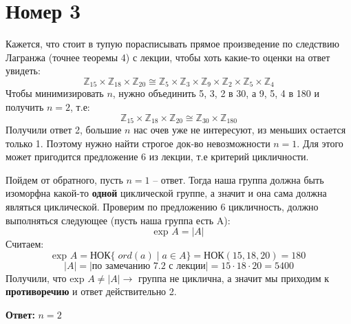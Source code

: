 \documentclass[a4paper,12pt, fleqn]{article}
\begin{document}
\section*{Номер 3}
Кажется, что стоит в тупую порасписывать прямое произведение по следствию Лагранжа (точнее теоремы 4) с лекции, чтобы хоть какие-то оценки на ответ увидеть:
\[
\mathbb{Z}_{15} \times \mathbb{Z}_{18} \times \mathbb{Z}_{20} \cong \mathbb{Z}_{5} \times \mathbb{Z}_{3} \times \mathbb{Z}_{9} \times \mathbb{Z}_{2} \times \mathbb{Z}_{5} \times \mathbb{Z}_{4}
\]
Чтобы минимизировать $n$, нужно объединить 5, 3, 2 в 30, а 9, 5, 4 в 180 и получить $n = 2$, т.е:
\[
\mathbb{Z}_{15} \times \mathbb{Z}_{18} \times \mathbb{Z}_{20} \cong \mathbb{Z}_{30} \times \mathbb{Z}_{180}
\]
Получили ответ 2, большие $n$ нас очев уже не интересуют, из меньших остается только 1. Поэтому нужно найти строгое док-во невозможности $n = 1$. Для этого может пригодится предложение 6 из лекции, т.е критерий цикличности. 

Пойдем от обратного, пусть $n = 1$ -- ответ. Тогда наша группа должна быть изоморфна какой-то \textbf{одной} циклической группе, а значит и она сама должна являться циклической. Проверим по предложению 6 цикличность, должно выполняться следующее (пусть наша группа есть A):
\[
\text{exp } A = |A|
\]
Считаем:
\[
\text{exp } A = \text{НОК} \{\;ord(a)\; | \;a \in A \} = \text{НОК} (15, 18, 20) = 180
\]
\[
|A| = \big| \text{по замечанию 7.2 с лекции} \big| = 15 \cdot 18 \cdot 20 = 5400
\]
Получили, что $\text{exp } A \neq |A| \rightarrow$ группа не циклична, а значит мы приходим к \textbf{противоречию} и ответ действительно 2.
\begin{center}
\textbf{Ответ: } $ n = 2 $
\end{center}
\end{document}
